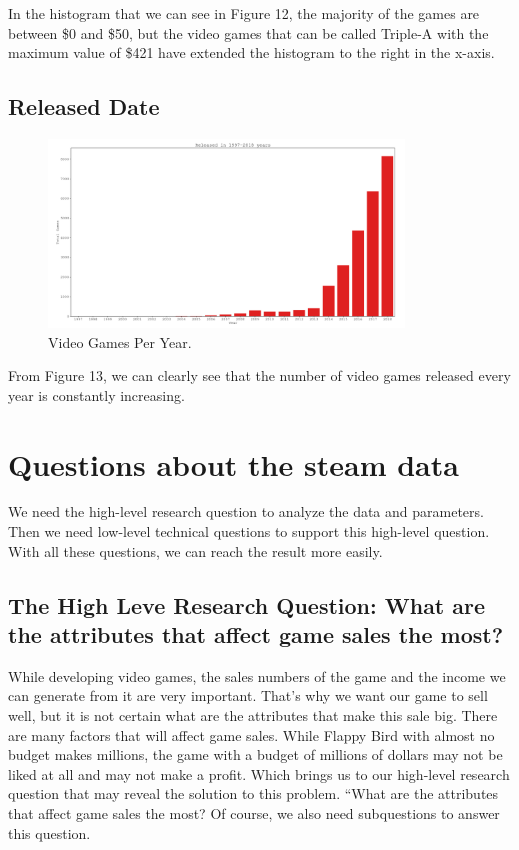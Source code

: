 \documentclass[conference]{IEEEtran}
\begin{document}
In the histogram that we can see in Figure 12, the majority of the games are between \$0 and \$50, but the video games that can be called Triple-A with the maximum value of \$421 have extended the histogram to the right in the x-axis.

\subsection{Released Date}


\begin{figure}[h]
  \includegraphics[width=\linewidth, height=5cm]{assets-1/released_date_bar.png}
  \caption{Video Games Per Year.}
  \label{fig:releaseddate1}
\end{figure}

From Figure 13, we can clearly see that the number of video games released every year is constantly increasing.

\section{Questions about the steam data}
We need the high-level research question to analyze the data and parameters. Then we need low-level technical questions to support this high-level question. With all these questions, we can reach the result more easily.

\subsection{The High Leve Research Question: What are the attributes that affect game sales the most?}\label{AA}
While developing video games, the sales numbers of the game and the income we can generate from it are very important. That's why we want our game to sell well, but it is not certain what are the attributes that make this sale big. There are many factors that will affect game sales. While Flappy Bird with almost no budget makes millions, the game with a budget of millions of dollars may not be liked at all and may not make a profit. Which brings us to our high-level research question that may reveal the solution to this problem. “What are the attributes that affect game sales the most? Of course, we also need subquestions to answer this question.
\end{document}
